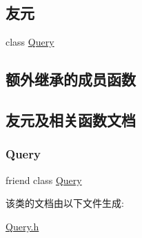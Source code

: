 \subsection*{友元}
\begin{DoxyCompactItemize}
\item 
class \hyperlink{classWordQuery_a0de80064a367adf51ab09f7a9b6de05a}{Query}
\end{DoxyCompactItemize}
\subsection*{额外继承的成员函数}


\subsection{友元及相关函数文档}
\mbox{\label{classWordQuery_a0de80064a367adf51ab09f7a9b6de05a}} 
\subsubsection{\texorpdfstring{Query}{Query}}
{\footnotesize\ttfamily friend class \hyperlink{classQuery}{Query}\hspace{0.3cm}{\ttfamily [friend]}}



该类的文档由以下文件生成\+:\begin{DoxyCompactItemize}
\item 
\hyperlink{Query_8h}{Query.\+h}\end{DoxyCompactItemize}
